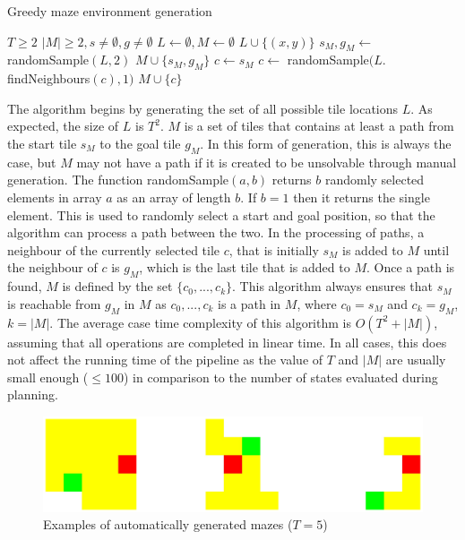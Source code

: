 \begin{algorithm}
    \caption{Greedy maze environment generation}\label{alg:cap}
    \begin{algorithmic}
        \Require $T \geq 2$
        \Ensure $|M| \geq 2, s \neq \emptyset, g \neq \emptyset$
        \State $L \gets \emptyset, M \gets \emptyset$
            \State $L \cup \{(x, y)\}$
            \EndFor
        \EndFor
        \State $s_M, g_M \gets$ randomSample$(L, 2)$
        \State $M \cup \{s_M, g_M\}$
        \State $c \gets s_M$
            \State $c \gets$ randomSample$(L.$findNeighbours$(c), 1)$
                \State $M \cup \{c\}$
            \EndIf
        \EndWhile
    \end{algorithmic}
\end{algorithm}
\noindent The algorithm begins by generating the set of all possible tile locations $L$. As expected, the size of $L$ is $T^2$. $M$ is a set of tiles that contains at least a path from the start tile $s_M$ to the goal tile $g_M$. In this form of generation, this is always the case, but $M$ may not have a path if it is created to be unsolvable through manual generation. The function randomSample$(a, b)$ returns $b$ randomly selected elements in array $a$ as an array of length $b$. If $b = 1$ then it returns the single element. This is used to randomly select a start and goal position, so that the algorithm can process a path between the two. In the processing of paths, a neighbour of the currently selected tile $c$, that is initially $s_M$ is added to $M$ until the neighbour of $c$ is $g_M$, which is the last tile that is added to $M$. Once a path is found, $M$ is defined by the set $\{c_0, ..., c_k\}$. This algorithm always ensures that $s_M$ is reachable from $g_M$ in $M$ as $c_0, ..., c_k$ is a path in $M$, where $c_0 = s_M$ and $c_k = g_M$, $k = |M|$. The average case time complexity of this algorithm is $O(T^2 + |M|)$, assuming that all operations are completed in linear time. In all cases, this does not affect the running time of the pipeline as the value of $T$ and $|M|$ are usually small enough ($\leq 100$) in comparison to the number of states evaluated during planning.
\begin{figure}[h!]
\centering
\includegraphics[width=\textwidth]{images/auto_maze_gen.png}
\caption{Examples of automatically generated mazes ($T=5$)}
\end{figure}

